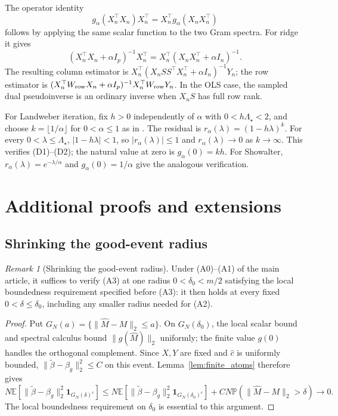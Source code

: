 \documentclass[11pt,a4paper,leqno]{article}
\numberwithin{equation}{section}
\numberwithin{figure}{section}
\numberwithin{table}{section}
\theoremstyle{plain}
\theoremstyle{definition}
\theoremstyle{remark}
\newtheorem{remark}[lemma]{Remark}
\newcommand{\E}{\mathbb E}
\newcommand{\Prob}{\mathbb P}
\begin{document}
The operator identity
\[
 g_\alpha(X_n^\top X_n)X_n^\top=X_n^\top g_\alpha(X_nX_n^\top)
\]
follows by applying the same scalar function to the two Gram spectra.
For ridge it gives
\[
 (X_n^\top X_n+\alpha I_p)^{-1}X_n^\top
 =X_n^\top(X_nX_n^\top+\alpha I_n)^{-1}.
\]
The resulting column estimator is
$X_n^\top(X_nSS^\top X_n^\top+\alpha I_n)^{-1}Y_n$;
the row estimator is
$(X_n^\top W_{\rm row}X_n+\alpha I_p)^{-1}X_n^\top W_{\rm row}Y_n$.
In the OLS case, the sampled dual pseudoinverse is an ordinary inverse
when $X_nS$ has full row rank.

For Landweber iteration, fix $h>0$ independently of $\alpha$ with
$0<h\Lambda_\star<2$, and choose $k=\lfloor1/\alpha\rfloor$ for
$0<\alpha\le1$ as in \citet[Example~3.3]{wang2024linear}.
The residual is $r_\alpha(\lambda)=(1-h\lambda)^k$.
For every $0<\lambda\le\Lambda_\star$, $|1-h\lambda|<1$, so
$|r_\alpha(\lambda)|\le1$ and $r_\alpha(\lambda)\to0$ as $k\to\infty$.
This verifies (D1)--(D2); the natural value at zero is $g_\alpha(0)=kh$.
For Showalter, $r_\alpha(\lambda)=e^{-\lambda/\alpha}$ and
$g_\alpha(0)=1/\alpha$ give the analogous verification.


\section{Additional proofs and extensions}
\label{supp:sec:proofs}
\subsection{Shrinking the good-event radius}
\label{supp:proof-tail-radius}
\begin{remark}[Shrinking the good-event radius]\label{rem:fixed_tail_radius}
Under (A0)--(A1) of the main article, it suffices to verify (A3) at one
radius $0<\delta_0<m/2$ satisfying the local boundedness requirement
specified before (A3): it then holds at every fixed
$0<\delta\le\delta_0$, including any smaller radius needed for (A2).
\end{remark}
\begin{proof}
Put $G_N(a)=\{\|\widehat M-M\|_2\le a\}$.
On $G_N(\delta_0)$, the local scalar bound and spectral calculus bound
$\|g(\widehat M)\|_2$ uniformly; the finite value $g(0)$ handles the
orthogonal complement. Since $X,Y$ are fixed and $\widehat c$ is uniformly
bounded, $\|\widetilde\beta-\beta_g\|_2^2\le C$ on this event.
Lemma~\ref{lem:finite_atoms} therefore gives
\[
 N\E\!\left[\|\widetilde\beta-\beta_g\|_2^2 \mathbf{1}_{G_N(\delta)^c}\right]
 \le N\E\!\left[\|\widetilde\beta-\beta_g\|_2^2
                       \mathbf{1}_{G_N(\delta_0)^c}\right]
       +CN\Prob(\|\widehat M-M\|_2>\delta)\longrightarrow0.
\]
The local boundedness requirement on $\delta_0$ is essential to this argument.
\end{proof}
\end{document}
